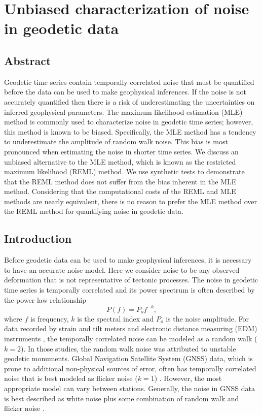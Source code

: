 \chapter{Unbiased characterization of noise in geodetic data}

\section{Abstract}
Geodetic time series contain temporally correlated noise that must be quantified before the data can be used to make geophysical inferences. If the noise is not accurately quantified then there is a risk of underestimating the uncertainties on inferred geophysical parameters. The maximum likelihood estimation (MLE) method is commonly used to characterize noise in geodetic time series; however, this method is known to be biased. Specifically, the MLE method has a tendency to underestimate the amplitude of random walk noise. This bias is most pronounced when estimating the noise in shorter time series. We discuss an unbiased alternative to the MLE method, which is known as the restricted maximum likelihood (REML) method. We use synthetic tests to demonstrate that the REML method does not suffer from the bias inherent in the MLE method. Considering that the computational costs of the REML and MLE methods are nearly equivalent, there is no reason to prefer the MLE method over the REML method for quantifying noise in geodetic data. 

\section{Introduction}\label{ch4:sec:Introduction}
Before geodetic data can be used to make geophysical inferences, it is necessary to have an accurate noise model. Here we consider noise to be any observed deformation that is not representative of tectonic processes. The noise in geodetic time series is temporally correlated and its power spectrum is often described by the power law relationship \citep{Agnew1992}       
\begin{equation}\label{eq.PowerLaw}
  P(f) = P_o f^{-k},
\end{equation}
where $f$ is frequency, $k$ is the spectral index and $P_o$ is the noise amplitude. For data recorded by strain and tilt meters \citep{Wyatt1982,Wyatt1989} and electronic distance measuring (EDM) instruments \citep{Langbein1997}, the temporally correlated noise can be modeled as a random walk ($k = 2$). In those studies, the random walk noise was attributed to unstable geodetic monuments. Global Navigation Satellite System (GNSS) data, which is prone to additional non-physical sources of error, often has temporally correlated noise that is best modeled as flicker noise ($k = 1$) \citep[e.g.,][]{Zhang1997,Mao1999,Williams2004}. However, the most appropriate model can vary between stations. Generally, the noise in GNSS data is best described as white noise plus some combination of random walk and flicker noise \citep{Langbein2008}. 

